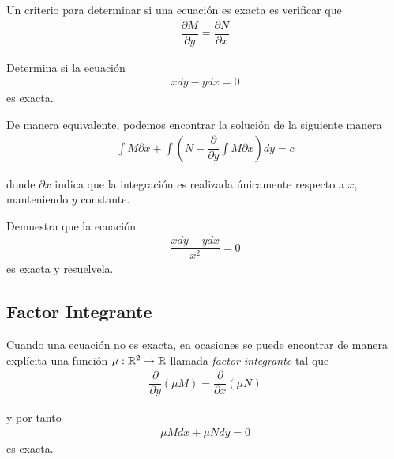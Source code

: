 {}
Un criterio para determinar si una ecuación es exacta es verificar que
\begin{align}
    \dfrac{\partial M}{\partial y}= \dfrac{\partial N}{\partial x}
    \end{align}



	\begin{resuelto}
		Determina si la ecuación
		\begin{align}
			xdy-ydx=0
		\end{align}
		es exacta.
	\end{resuelto}

{}
  De manera equivalente, podemos encontrar la solución de la siguiente manera
  \begin{align}
   \displaystyle \int M\partial x+ \int \left( N - \dfrac{\partial }{\partial y}\int M\partial x \right)dy = c
   \end{align}

   donde \emph{$\partial x$} indica que la integración es realizada únicamente respecto a $x$, manteniendo $y$ constante.



	\begin{resuelto}
		Demuestra que la ecuación
		\begin{align}
		\dfrac{xdy-ydx}{x^2}=0
		\end{align}
		es exacta y resuelvela.
	\end{resuelto}

\subsection{Factor Integrante}
  Cuando una ecuación no es exacta, en ocasiones se puede encontrar de manera explícita una función $\mu:\mathbb{R}^{2}\to \mathbb{R}$ llamada \emph{factor integrante} tal que
\begin{align}
 \dfrac{\partial }{\partial y}\left( \mu M \right) =
 \dfrac{\partial }{\partial x}\left( \mu N \right)
 \end{align}

 y por tanto
 \begin{align}
  \mu M dx + \mu N dy = 0
  \end{align}
  es exacta.


